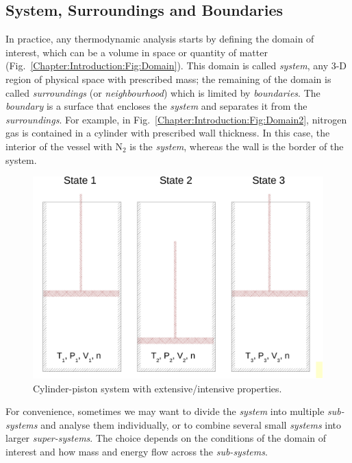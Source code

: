    \subsection{System, Surroundings and Boundaries}\label{Chapter:Introduction:Section:Introduction:SystemSurroundingsBoundaries}
   In practice, any thermodynamic analysis starts by defining the domain of interest, which can be a volume in space or quantity of matter (Fig.~\ref{Chapter:Introduction:Fig:Domain}). This domain is called {\it system}, \ie any 3-D region of physical space with prescribed mass; the remaining of the domain is called {\it surroundings} (or {\it neighbourhood}) which is limited by {\it boundaries}. The {\it boundary} is a surface that encloses the {\it system} and separates it from the {\it surroundings}. For example, in Fig.~\ref{Chapter:Introduction:Fig:Domain2}, nitrogen gas is contained in a cylinder with prescribed wall thickness. In this case, the interior of the vessel with N$_{2}$ is the {\it system}, whereas the wall is the border of the system. 
   
   \begin{figure}[h]
     \begin{center}
        \includegraphics[width=0.7\columnwidth,clip]{./../Pics/Fig_SystemDefinition3}
        \caption{Cylinder-piston system with extensive/intensive properties.}\label{Chapter:Introduction:Fig:Domain3}
     \end{center}
   \end{figure}

   For convenience, sometimes we may want to divide the {\it system} into multiple {\it sub-systems} and analyse them individually, or to combine several small {\it systems} into larger {\it super-systems}. The choice depends on the conditions of the domain of interest and how mass and energy flow across the {\it sub-systems}.

